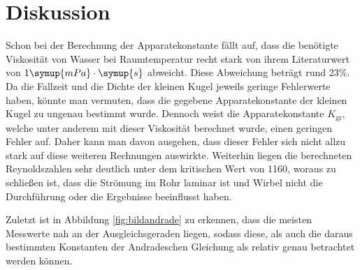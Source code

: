 \section{Diskussion}
Schon bei der Berechnung der Apparatekonstante fällt auf, dass die benötigte Viskosität von Wasser bei Raumtemperatur recht stark von ihrem Literaturwert von $1 \symup{mPa} \cdot \symup{s}$ abweicht. Diese Abweichung beträgt 
rund 23\%.
Da die Fallzeit und die Dichte der kleinen Kugel jeweils geringe Fehlerwerte haben, könnte man vermuten, dass die gegebene Apparatekonstante der kleinen Kugel zu ungenau bestimmt wurde.
Dennoch weist die Apparatekonstante $K_{\text{gr}}$, welche unter anderem mit dieser Viskosität berechnet wurde, einen geringen Fehler auf. Daher kann man davon ausgehen, dass dieser Fehler sich nicht allzu stark auf diese
weiteren Rechnungen auswirkte. 
Weiterhin liegen die berechneten Reynoldszahlen sehr deutlich unter dem kritischen Wert von 1160, woraus zu schließen ist, dass die Strömung im Rohr laminar ist und Wirbel nicht die Durchführung oder die Ergebnisse beeinflusst 
haben.

Zuletzt ist in Abbildung \eqref{fig:bildandrade} zu erkennen, dass die meisten Messwerte nah an der Ausgleichsgeraden liegen, sodass diese, als auch die daraus bestimmten Konstanten der Andradeschen Gleichung als 
relativ genau betrachtet werden können. 